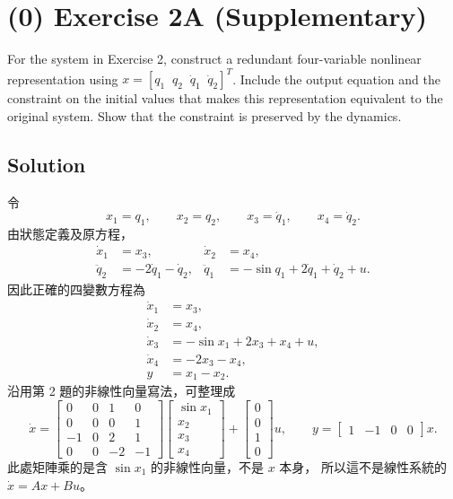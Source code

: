 \documentclass[12pt,a4paper]{article}
\begin{document}
\vspace{3cm}
\clearpage
\section*{(0) Exercise 2A \hfill {\normalsize (Supplementary)}}
For the system in Exercise 2, construct a redundant four-variable nonlinear
representation using $x=[q_1\;\;q_2\;\;\dot q_1\;\;\dot q_2]^T$.
Include the output equation and the constraint on the initial values that
makes this representation equivalent to the original system.
Show that the constraint is preserved by the dynamics.

\subsection*{Solution}
令
\[
x_1=q_1,\qquad x_2=q_2,\qquad x_3=\dot q_1,\qquad x_4=\dot q_2.
\]
由狀態定義及原方程，
\begin{align*}
\dot x_1&=x_3, & \dot x_2&=x_4,\\
\ddot q_2&=-2\dot q_1-\dot q_2, &
\ddot q_1&=-\sin q_1+2\dot q_1+\dot q_2+u.
\end{align*}
因此正確的四變數方程為
\[
\boxed{\begin{aligned}
\dot x_1&=x_3,\\
\dot x_2&=x_4,\\
\dot x_3&=-\sin x_1+2x_3+x_4+u,\\
\dot x_4&=-2x_3-x_4,\\
y&=x_1-x_2.
\end{aligned}}
\]
沿用第 2 題的非線性向量寫法，可整理成
\[
\dot x=
\begin{bmatrix}
0&0&1&0\\
0&0&0&1\\
-1&0&2&1\\
0&0&-2&-1
\end{bmatrix}
\begin{bmatrix}\sin x_1\\x_2\\x_3\\x_4\end{bmatrix}
+\begin{bmatrix}0\\0\\1\\0\end{bmatrix}u,
\qquad
y=\begin{bmatrix}1&-1&0&0\end{bmatrix}x.
\]
此處矩陣乘的是含 $\sin x_1$ 的非線性向量，不是 $x$ 本身，
所以這不是線性系統的 $\dot x=Ax+Bu$。
\end{document}

